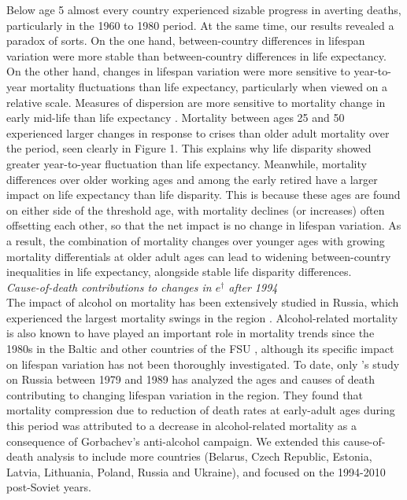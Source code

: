 \documentclass{article}
\begin{document}
\begin{spacing}{1.5}
Below age 5 almost every country experienced sizable progress in averting deaths, particularly in the 1960 to 1980 period. At the same time, our results revealed a paradox of sorts. On the one hand, between-country differences in lifespan variation were more stable than between-country differences in life expectancy. On the other hand, changes in lifespan variation were more sensitive to year-to-year mortality fluctuations than life expectancy, particularly when viewed on a relative scale. Measures of dispersion are more sensitive to mortality change in early mid-life than life expectancy \citep{vanraalte2013}. Mortality between ages 25 and 50 experienced larger changes in response to crises than older adult mortality over the period, seen clearly in Figure 1. This explains why life disparity showed greater year-to-year fluctuation than life expectancy. Meanwhile, mortality differences over older working ages and among the early retired have a larger impact on life expectancy than life disparity. This is because these ages are found on either side of the threshold age, with mortality declines (or increases) often offsetting each other, so that the net impact is no change in lifespan variation. As a result, the combination of mortality changes over younger ages with growing mortality differentials at older adult ages can lead to widening between-country inequalities in life expectancy, alongside stable life disparity differences.
\\

\emph{Cause-of-death contributions to changes in $e^\dagger$ after 1994}\\

The impact of alcohol on mortality has been extensively studied in Russia, which experienced the largest mortality swings in the region \citep{leon1997huge,rehm2007, shkolnikov2013components,shkolnikov2001}. Alcohol-related mortality is also known to have played an important role in mortality trends since the 1980s in the Baltic and other countries of the FSU \citep{rehm2007,jasilionis2011}, 
although its specific impact on lifespan variation has not been thoroughly investigated. To date, only \citet{shkolnikov2003}'s study on Russia between 1979 and 1989 has analyzed the ages and causes of death contributing to changing lifespan variation in the region. They found that mortality compression due to reduction of death rates at early-adult ages during this period was attributed to a decrease in alcohol-related mortality as a consequence of Gorbachev's anti-alcohol campaign. We extended this cause-of-death analysis to include more countries (Belarus, Czech Republic, Estonia, Latvia, Lithuania, Poland, Russia and Ukraine), and focused on the 1994-2010 post-Soviet years.\\


\end{spacing}
\end{document}
